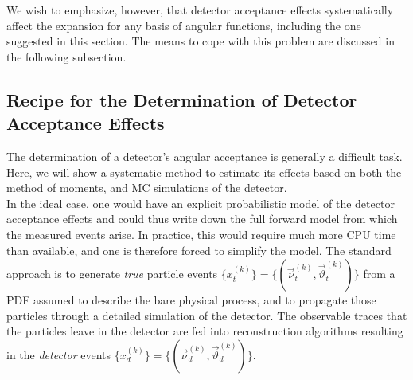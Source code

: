 \documentclass[aps,prd,reprint,nofootinbib,preprintnumbers]{revtex4}
\renewcommand{\theta}{\vartheta}
\begin{document}
We wish to emphasize, however, that detector acceptance effects systematically affect the expansion for any basis
of angular functions, including the one suggested in this section. The means to cope with this problem are discussed
in the following subsection.


\subsection{Recipe for the Determination of Detector Acceptance Effects}
\label{sec:systematics:acceptance}

The determination of a detector's angular acceptance is generally a difficult
task. Here, we will show a systematic method to estimate its effects
based on both the method of moments, and MC simulations of the
detector.\\

In the ideal case, one would have an explicit probabilistic
model of the detector acceptance effects and could thus write down
the full forward model from which the measured events arise. In practice,
this would require much more CPU time than available, and one is
therefore forced to simplify the model. The standard approach is to
generate \emph{true} particle events $\lbrace x_t^{(k)}\rbrace =
\lbrace(\vec{\nu}^{(k)}_t,\vec\theta^{(k)}_t)\rbrace$ from a PDF
assumed to describe the bare physical process, and to propagate
those particles through a detailed simulation of the detector. The
observable traces that the particles leave in the detector are fed
into reconstruction algorithms resulting in the \emph{detector}
events $\lbrace x^{(k)}_d\rbrace = \lbrace(\vec{\nu}^{(k)}_d,
\vec\theta^{(k)}_d)\rbrace$.\\
\end{document}
